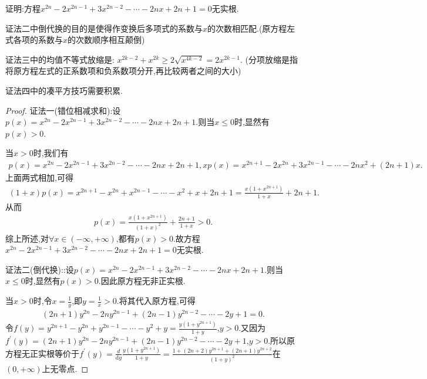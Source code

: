 \documentclass[lang=cn,newtx,10pt,scheme=chinese]{../Template/elegantbook}
\begin{document}
\begin{exercise}
    证明:方程\(x^{2n}-2x^{2n - 1}+3x^{2n - 2}-\cdots - 2nx + 2n + 1 = 0\)无实根.
\end{exercise}
\begin{note}\label{note:1.1111}
    {\color{blue}证法二}中倒代换的目的是使得作变换后多项式的系数与$x$的次数相匹配.(原方程左式各项的系数与$x$的次数顺序相互颠倒)

    {\color{blue}证法三}中的均值不等式放缩是:
    $x^{2k-2}+x^{2k}\geq 2\sqrt{x^{4k-2}}=2x^{2k-1}$.
    (分项放缩是指将原方程左式的正系数项和负系数项分开,再比较两者之间的大小)

    {\color{blue}证法四}中的凑平方技巧需要积累.
\end{note}
\begin{proof}
    {\color{blue}证法一(错位相减求和):}设\(p(x) = x^{2n} - 2x^{2n - 1} + 3x^{2n - 2} - \cdots - 2nx + 2n + 1\).则当\(x \leq 0\)时,显然有\(p(x) > 0\).

    当\(x > 0\)时,我们有
    \begin{align*}
        p(x) = x^{2n} - 2x^{2n - 1} + 3x^{2n - 2} - \cdots - 2nx + 2n + 1,
    xp(x) = x^{2n + 1} - 2x^{2n} + 3x^{2n - 1} - \cdots - 2nx^2 + (2n + 1)x.
    \end{align*}
    上面两式相加,可得
    \begin{align*}
        (1 + x)p(x) = x^{2n + 1} - x^{2n} + x^{2n - 1} - \cdots - x^2 + x + 2n + 1 = \frac{x(1 + x^{2n + 1})}{1 + x} + 2n + 1.
    \end{align*}
    从而
    \begin{align*}
        p(x) = \frac{x(1 + x^{2n + 1})}{(1 + x)^2} + \frac{2n + 1}{1 + x} > 0.
    \end{align*}
    综上所述,对\(\forall x\in (-\infty, +\infty)\),都有\(p(x) > 0\).故方程\(x^{2n} - 2x^{2n - 1} + 3x^{2n - 2} - \cdots - 2nx + 2n + 1 = 0\)无实根.
    
    {\color{blue}证法二(倒代换):}:设\(p(x) = x^{2n} - 2x^{2n - 1} + 3x^{2n - 2} - \cdots - 2nx + 2n + 1\).则当\(x \leq 0\)时,显然有\(p(x) > 0\).因此原方程无非正实根.
    
    当\(x > 0\)时,令\(x = \frac{1}{y}\),即\(y = \frac{1}{x} > 0\).将其代入原方程,可得
    \begin{align*}
      (2n + 1)y^{2n} - 2ny^{2n - 1} + (2n - 1)y^{2n - 2} - \cdots - 2y + 1 = 0 .
    \end{align*}
    令\(f(y) = y^{2n + 1} - y^{2n} + y^{2n - 1} - \cdots - y^2 + y = \frac{y(1 + y^{2n + 1})}{1 + y}\),\(y > 0\).又因为\(f^{\prime}(y) = (2n + 1)y^{2n} - 2ny^{2n - 1} + (2n - 1)y^{2n - 2} - \cdots - 2y + 1\),\(y > 0\).所以原方程无正实根等价于\(f^{\prime}(y) = \frac{d}{\mathrm{d}y}\frac{y(1 + y^{2n + 1})}{1 + y} = \frac{1 + (2n + 2)y^{2n + 1} + (2n + 1)y^{2n + 2}}{(1 + y)^2}\)在\((0, +\infty)\)上无零点.
    

\end{proof}
\end{document}
